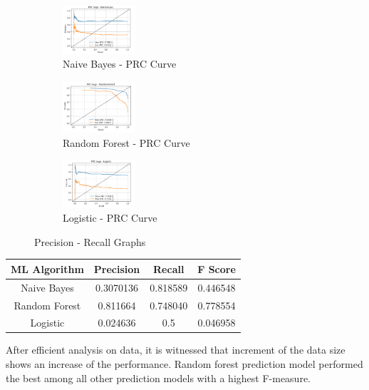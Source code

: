 \documentclass{seal_article}
\begin{document}
\vspace{0.5cm}
\begin{figure}[h] 
\centering
\captionsetup{justification=centering}
\begin{subfigure}{.3\linewidth}
  \centering
  \includegraphics[width=2.7cm]{img/naive_10.PNG}
  \caption{Naive Bayes - PRC Curve}
  \label{fig:sub1}
\end{subfigure}
\begin{subfigure}{.3\linewidth}
  \centering
  \includegraphics[width=2.7cm]{img/random_forest_10.PNG}
  \caption{Random Forest - PRC Curve}
  \label{fig:sub1}
\end{subfigure}
\begin{subfigure}{.3\linewidth}
  \centering
  \includegraphics[width=2.7cm]{img/logistic_10.PNG}
  \caption{Logistic - PRC Curve}
  \label{fig:sub2}
\end{subfigure}
\caption{Precision - Recall Graphs}
\label{fig.aug}
\end{figure} 
\begin{center}
 \begin{tabular}{||c c c c||} 
 \hline
 ML Algorithm &Precision & Recall & F Score   \\ [0.5ex] 
 \hline\hline
  Naive Bayes &0.3070136&0.818589& 0.446548\\ 
 \hline
 Random Forest & 0.811664 & 0.748040 & 0.778554 \\
 \hline
 Logistic & 0.024636 & 0.5 & 0.046958 \\
 \hline

\end{tabular}

\end{center}
 
After efficient analysis on data, it is witnessed that increment of the data size shows an increase of the performance. Random forest prediction model performed the best among all other prediction models with a highest F-measure.
\end{document}
